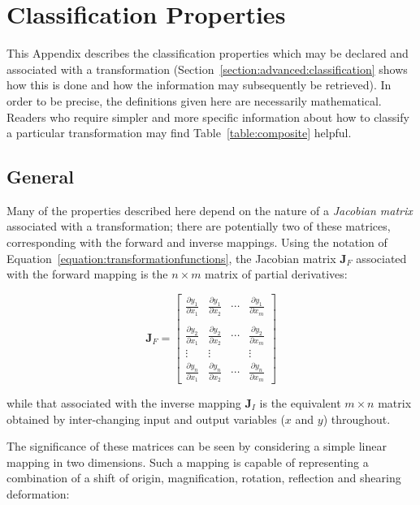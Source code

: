\documentclass[twoside,nolof,11pt]{starlink}
\providecommand{\pdiff}[2]{\frac{\partial y_{#1}}{\partial x_{#2}}}
\begin{document}
\newpage
\section{Classification Properties}

\label{appendix:classification}

This Appendix describes the classification properties which may be declared
and associated with a transformation
(Section~\ref{section:advanced:classification} shows how this is done and
how the information may subsequently be retrieved).
In order to be precise, the definitions given here are necessarily
mathematical.
Readers who require simpler and more specific information about how to
classify a particular transformation may find Table~\ref{table:composite}
helpful.


\subsection{General}

Many of the properties described here depend on the nature of a \emph{Jacobian
matrix} associated with a transformation; there are potentially two
of these matrices, corresponding with the forward and inverse mappings.
Using the notation of Equation~\ref{equation:transformationfunctions}, the
Jacobian matrix $\mathbf{J}_{F}$ associated with the forward mapping is the
\mbox{$n \times m$} matrix of partial derivatives:

\begin{equation}
\mathbf{J}_{F} = \left[ \begin{array}{cccc}
\pdiff{1}{1} & \pdiff{1}{2} & \cdots & \pdiff{1}{m} \\
             &              &        &              \\
\pdiff{2}{1} & \pdiff{2}{2} & \cdots & \pdiff{2}{m} \\
\vdots       & \vdots       &        & \vdots       \\
\pdiff{n}{1} & \pdiff{n}{2} & \cdots & \pdiff{n}{m}
\end{array} \right]
\end{equation}

while that associated with the inverse mapping $\mathbf{J}_{I}$ is the equivalent
\mbox{$m \times n$} matrix obtained by inter-changing input and output
variables ($x$ and $y$) throughout.

The significance of these matrices can be seen by considering a simple
linear mapping in two dimensions.
Such a mapping is capable of representing a combination of a shift of
origin, magnification, rotation, reflection and shearing deformation:
\end{document}
